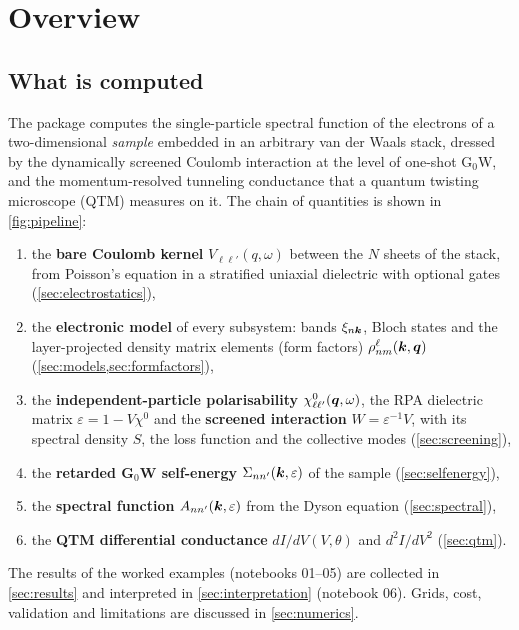 \section{Overview}
\label{sec:overview}

\subsection{What is computed}

The package computes the single-particle spectral function of the electrons of a two-dimensional
\emph{sample} embedded in an arbitrary van der Waals stack, dressed by the dynamically screened Coulomb
interaction at the level of one-shot G$_0$W, and the momentum-resolved tunneling conductance that a
quantum twisting microscope (QTM) measures on it. The chain of quantities is shown in \cref{fig:pipeline}:
\begin{enumerate}
\item the \textbf{bare Coulomb kernel} $V_{\ell\ell'}(q,\omega)$ between the $N$ sheets of the stack, from
      Poisson's equation in a stratified uniaxial dielectric with optional gates (\cref{sec:electrostatics}),
\item the \textbf{electronic model} of every subsystem: bands $\xi_{n\bm k}$, Bloch states and the
      layer-projected density matrix elements (form factors) $\rho^\ell_{nm}(\bm k,\bm q)$ (\cref{sec:models,sec:formfactors}),
\item the \textbf{independent-particle polarisability} $\chi^0_{\ell\ell'}(\bm q,\omega)$, the RPA dielectric
      matrix $\varepsilon=1-V\chi^0$ and the \textbf{screened interaction} $W=\varepsilon^{-1}V$, with its spectral
      density $S$, the loss function and the collective modes (\cref{sec:screening}),
\item the \textbf{retarded G$_0$W self-energy} $\Sigma_{nn'}(\bm k,\varepsilon)$ of the sample (\cref{sec:selfenergy}),
\item the \textbf{spectral function} $A_{nn'}(\bm k,\varepsilon)$ from the Dyson equation (\cref{sec:spectral}),
\item the \textbf{QTM differential conductance} $dI/dV(V,\theta)$ and $d^2I/dV^2$ (\cref{sec:qtm}).
\end{enumerate}
The results of the worked examples (notebooks 01--05) are collected in \cref{sec:results} and interpreted in
\cref{sec:interpretation} (notebook 06). Grids, cost, validation and limitations are discussed in \cref{sec:numerics}.

